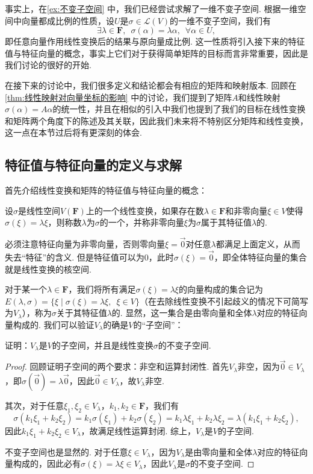 事实上，在\autoref{ex:不变子空间} 中，我们已经尝试求解了一维不变子空间. 根据一维空间中向量都成比例的性质，设$U$是$\sigma\in\mathcal{L}(V)$的一维不变子空间，我们有
\[\exists\lambda\in\mathbf{F},\enspace\sigma(\alpha)=\lambda\alpha,\enspace\forall \alpha\in U,\]
即任意向量作用线性变换后的结果与原向量成比例. 这一性质将引入接下来的特征值与特征向量的概念，事实上它们对于获得简单矩阵的目标而言非常重要，因此是我们讨论的很好的开始.

在接下来的讨论中，我们很多定义和结论都会有相应的矩阵和映射版本. 回顾在\autoref{thm:线性映射对向量坐标的影响} 中的讨论，我们提到了矩阵$A$和线性映射$\sigma(\alpha)=A\alpha$的统一性，并且在相似的引入中我们也提到了我们的目标在线性变换和矩阵两个角度下的陈述及其关联，因此我们未来将不特别区分矩阵和线性变换，这一点在本节过后将有更深刻的体会.

\subsection{特征值与特征向量的定义与求解}

首先介绍线性变换和矩阵的特征值与特征向量的概念：
\begin{definition}{}{}
    设$\sigma$是线性空间$V(\mathbf{F})$上的一个线性变换，如果存在数$\lambda\in\mathbf{F}$和非零向量$\xi\in V$使得$\sigma(\xi)=\lambda\xi$，则称数$\lambda$为$\sigma$的一个，并称非零向量$\xi$为$\sigma$属于其特征值$\lambda$的.
\end{definition}
必须注意特征向量为非零向量，否则零向量$\xi=\vec{0}$对任意$\lambda$都满足上面定义，从而失去``特征''的含义. 但是特征值可以为0，此时$\sigma(\xi)=\vec{0}$，即全体特征向量的集合就是线性变换的核空间.

对于某一个$\lambda\in\mathbf{F}$，我们将所有满足$\sigma(\xi)=\lambda\xi$的向量构成的集合记为$E(\lambda,\sigma)=\{\xi \mid \sigma(\xi)=\lambda\xi,\enspace\xi\in V\}$（在去除线性变换不引起歧义的情况下可简写为$V_\lambda$），称为$\sigma$关于其特征值$\lambda$的. 显然，这一集合是由零向量和全体$\lambda$对应的特征向量构成的. 我们可以验证$V_\lambda$的确是$V$的``子空间''：
\begin{example}{}{}
    证明：$V_\lambda$是$V$的子空间，并且是线性变换$\sigma$的不变子空间.
\end{example}

\begin{proof}
    回顾证明子空间的两个要求：非空和运算封闭性. 首先$V_\lambda$非空，因为$\vec{0}\in V_\lambda$，即$\sigma(\vec{0})=\lambda\vec{0}$，因此$\vec{0}\in V_\lambda$，故$V_\lambda$非空.

    其次，对于任意$\xi_1,\xi_2\in V_\lambda$，$k_1,k_2\in\mathbf{F}$，我们有
    \[\sigma(k_1\xi_1+k_2\xi_2)=k_1\sigma(\xi_1)+k_2\sigma(\xi_2)=k_1\lambda\xi_1+k_2\lambda\xi_2=\lambda(k_1\xi_1+k_2\xi_2),\]
    因此$k_1\xi_1+k_2\xi_2\in V_\lambda$，故满足线性运算封闭. 综上，$V_\lambda$是$V$的子空间.

    不变子空间也是显然的. 对于任意$\xi\in V_\lambda$，因为$V_\lambda$是由零向量和全体$\lambda$对应的特征向量构成的，因此必有$\sigma(\xi)=\lambda\xi\in V_\lambda$，因此$V_\lambda$是$\sigma$的不变子空间.
\end{proof}

